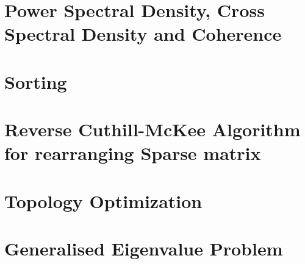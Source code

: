\section{Power Spectral Density, Cross Spectral Density and Coherence}

\section{Sorting}

\section{Reverse Cuthill-McKee Algorithm for rearranging Sparse matrix}

\section{Topology Optimization}

\section{Generalised Eigenvalue Problem}




